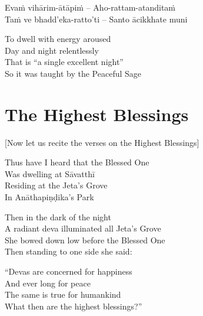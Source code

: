 \begin{twochants}
  Evaṁ vihārim-ātāpiṁ – Aho-rattam-atanditaṁ\\
  Taṁ ve bhadd’eka-ratto’ti – Santo ācikkhate muni\\
\end{twochants}

\begin{english}
  To dwell with energy aroused\\
  Day and night relentlessly\\
  That is “a single excellent night”\\
  So it was taught by the Peaceful Sage
\end{english}

\suttaRef{[MN 131]}


\section{The Highest Blessings}
\label{highest-blessings}

\begin{center}
  [Now let us recite the verses on the Highest Blessings]
\end{center}

Thus have I heard that the Blessed One\\
Was dwelling at Sāvatthī\\
Residing at the Jeta’s Grove\\
In Anāthapiṇḍika’s Park

Then in the dark of the night\\
A radiant deva illuminated all Jeta’s Grove\\
She bowed down low before the Blessed One\\
Then standing to one side she said:

“Devas are concerned for happiness\\
And ever long for peace\\
The same is true for humankind\\
What then are the highest blessings?”

